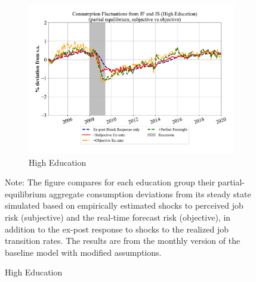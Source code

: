\begin{figure}[ht]
\begin{subfigure}{0.32\linewidth}
    \end{subfigure}
    \hfill
    \begin{subfigure}{0.32\linewidth}
      \caption*{High Education}
        \includegraphics[width=\linewidth]{Figures/consumption_pe_JS_JF_deviation_machine_as_rational_HighEdu_monthly.pdf}
      
    \end{subfigure}

    \begin{flushleft}
        \footnotesize 
        Note: The figure compares for each education group their partial-equilibrium aggregate consumption deviations from its steady state simulated based on empirically estimated shocks to perceived job risk (subjective) and the real-time forecast risk (objective), in addition to the ex-post response to shocks to the realized job transition rates. The results are from the monthly version of the baseline model with modified assumptions.
    \end{flushleft}
\end{figure}